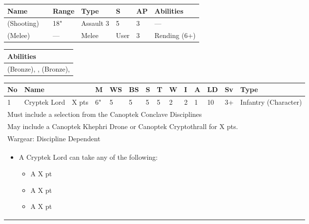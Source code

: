 \noindent
\begin{tabular}{||m{110pt} m{30pt} m{31pt} m{55pt} m{12pt} m{12pt} m{210pt}||}
	\hline
	Name & & Range & Type & S & AP & Abilities \\
	\hline
	\quickref{Staff of Light} (Shooting) & & 18" & Assault 3 & 5 & 3 & — \\
	\quickref{Staff of Light} (Melee) & & — & Melee & User & 3 & Rending (6+) \\
	\hline
\end{tabular}

\noindent
\begin{tabular}{||m{532pt}||}
	\hline
	Abilities \\
	\hline
	\quickref{Awakening Protocols}(Bronze), \quickref{Living Metal}, \quickref{Nodal Command} (Bronze), \quickref{Reanimation Protocols} \\
	\hline
\end{tabular}



\newpage
{}

\noindent
\begin{tabular}{||m{10pt} m{95pt} m{30pt} m{11pt} m{11pt} m{11pt} m{11pt} m{11pt} m{11pt} m{11pt} m{11pt} m{11pt} m{11pt} m{125pt}||}
	\hline
	No & Name & & M & WS & BS & S & T & W & I & A & LD & Sv & Type \\
	\hline
	1 & Cryptek Lord & X pts & 6" & 5 & 5 & 5 & 5 & 2 & 2 & 1 & 10 & 3+ & Infantry (Character)\\
	\hline
	\hline
	\multicolumn{14}{||Z{532 pt}||}{Must include a selection from the Canoptek Conclave Disciplines}\\
	\multicolumn{14}{||Z{532 pt}||}{May include a Canoptek Khephri Drone or Canoptek Cryptothrall for X pts.}\\	
	\hline
	\hline
	\multicolumn{14}{||Z{532 pt}||}{Wargear: Discipline Dependent} \\		
	\multicolumn{14}{||Z{532 pt}||}{\begin{itemize}
			\item A Cryptek Lord can take any of the following:
			\begin{itemize}
				\item A \quickref{Phase Shifter} \hrulefill X pt
				\item A \quickref{Phylactery} \hrulefill X pt
				\item A \quickref{Sempiternal Weave} \hrulefill X pt
			\end{itemize}
	\end{itemize}} \\	
	\hline
\end{tabular}

